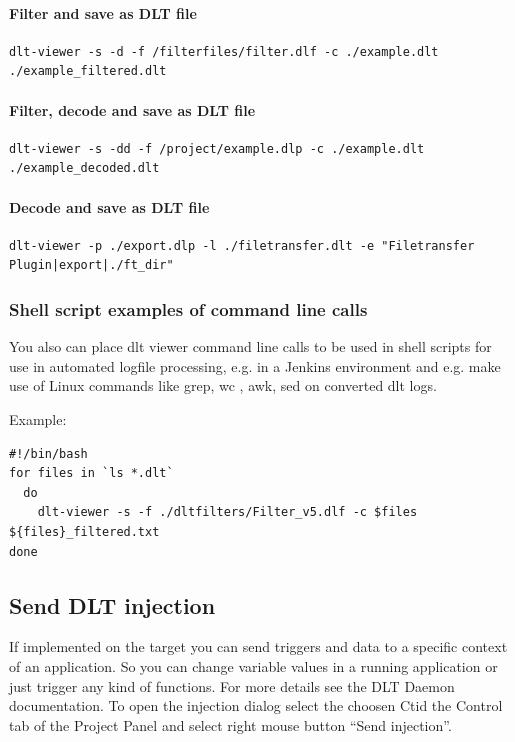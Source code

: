 \documentclass[a4paper,11pt]{article}
\begin{document}
\paragraph{Filter and save as DLT file}
\begin{verbatim}
dlt-viewer -s -d -f /filterfiles/filter.dlf -c ./example.dlt ./example_filtered.dlt
\end{verbatim}

\paragraph{Filter, decode and save as DLT file}
\begin{verbatim}
dlt-viewer -s -dd -f /project/example.dlp -c ./example.dlt ./example_decoded.dlt
\end{verbatim}

\paragraph{Decode and save as DLT file}
\begin{verbatim}
dlt-viewer -p ./export.dlp -l ./filetransfer.dlt -e "Filetransfer Plugin|export|./ft_dir"
\end{verbatim}

\subsubsection{Shell script examples of command line calls}

You also can place dlt viewer command line calls to be used in shell scripts for use
in automated logfile processing, e.g. in a Jenkins environment 
and e.g. make use of Linux commands like grep, wc , awk, sed on converted dlt logs.

Example:
\begin{verbatim}
#!/bin/bash
for files in `ls *.dlt`
  do
    dlt-viewer -s -f ./dltfilters/Filter_v5.dlf -c $files ${files}_filtered.txt
done
\end{verbatim}

\pagebreak

\subsection{Send DLT injection}
If implemented on the target you can send triggers and data to a specific context of an application.
So you can change variable values in a running application or just trigger any kind of functions.
For more details see the DLT Daemon documentation.\linebreak
To open the injection dialog select the choosen Ctid the Control tab of the Project Panel and
select right mouse button ``Send injection''.
\end{document}
